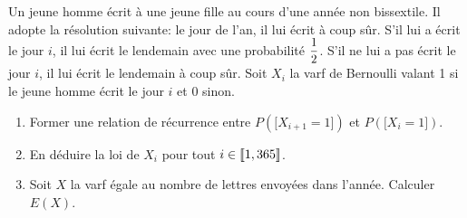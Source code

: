 \documentclass[a4paper, 11pt,reqno]{article}
\begin{document}
\begin{exercice}  \;
	Un jeune homme \'ecrit \`a une jeune fille au cours d'une ann\'ee non bissextile. Il adopte la r\'esolution suivante: le jour de l'an, il lui \'ecrit \`a coup s\^ur. S'il lui a \'ecrit le jour $i$, il lui \'ecrit le lendemain avec une probabilit\'e $\displaystyle\frac{1}{2}$. S'il ne lui a pas \'ecrit le jour $i$, il lui \'ecrit le lendemain \`a coup s\^ur. Soit $X_i$ la varf de Bernoulli valant 1 si le jeune homme \'ecrit le jour $i$ et 0 sinon.
	\begin{enumerate}
		\item Former une relation de r\'ecurrence entre $P(\lbrack X_{i+1}=1\rbrack)$ et $P(\lbrack X_{i}=1\rbrack)$.
		\item En d\'eduire la loi de $X_i$ pour tout $i\in\llbracket  1,365\rrbracket$.
		\item Soit $X$ la varf \'egale au nombre de lettres envoy\'ees dans l'ann\'ee. Calculer $E(X)$.
	\end{enumerate}
\end{exercice}
\end{document}
